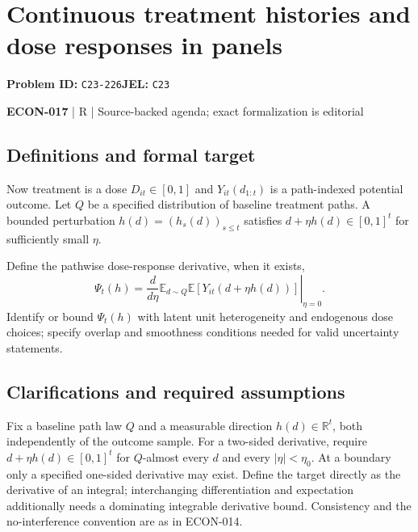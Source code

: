 \documentclass[11pt,a4paper]{article}
\begin{document}
\section*{Continuous treatment histories and dose responses in panels}
\textbf{Problem ID:} \texttt{C23-226}\quad \textbf{JEL:} \texttt{C23}\par
\label{problem:OP-0602}


\label{audited:ECON-017}

{\sffamily\small\color{muted}\textbf{ECON-017} | R | Source-backed agenda; exact formalization is editorial\par}

\subsection*{Definitions and formal target}

Now treatment is a dose $D_{it}\in[0,1]$ and $Y_{it}(d_{1:t})$ is a path-indexed potential outcome. Let $Q$ be a specified distribution of baseline treatment paths. A bounded perturbation $h(d)=(h_s(d))_{s\leq t}$ satisfies $d+\eta h(d)\in[0,1]^t$ for sufficiently small $\eta$.

Define the pathwise dose-response derivative, when it exists,
\[
 \Psi_t(h)=\left.\frac{d}{d\eta}\mathbb E_{d\sim Q}\mathbb E[Y_{it}(d+\eta h(d))]\right|_{\eta=0}.
\]
Identify or bound $\Psi_t(h)$ with latent unit heterogeneity and endogenous dose choices; specify overlap and smoothness conditions needed for valid uncertainty statements.

\subsection*{Clarifications and required assumptions}

Fix a baseline path law $Q$ and a measurable direction $h(d)\in\mathbb R^t$, both independently of the outcome sample. For a two-sided derivative, require $d+\eta h(d)\in[0,1]^t$ for $Q$-almost every $d$ and every $|\eta|<\eta_0$. At a boundary only a specified one-sided derivative may exist. Define the target directly as the derivative of an integral; interchanging differentiation and expectation additionally needs a dominating integrable derivative bound. Consistency and the no-interference convention are as in ECON-014.
\end{document}
